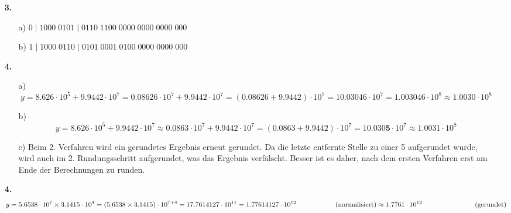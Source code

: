 \documentclass[a4paper,10pt]{scrartcl}
\begin{document}
\begin{enumerate}
\begin{enumerate}
        \end{enumerate}

    \item[\textbf{3.}]
        \begin{enumerate}
            \item[a)]
                $0 \mid 1000\;0101 \mid 0110\;1100\;0000\;0000\;0000\;000$
            
            \item[b)]
                $1 \mid 1000\;0110 \mid 0101\;0001\;0100\;0000\;0000\;000$
    
        \end{enumerate}
        
    \item[\textbf{4.}]
        \begin{enumerate}
            \item[a)]
                \begin{dmath*}
                    y 
                    = 8.626 \cdot 10^5 + 9.9442 \cdot 10^7
                    = 0.08626 \cdot 10^7 + 9.9442 \cdot 10^7
                    = (0.08626 + 9.9442) \cdot 10^7
                    = 10.03046 \cdot 10^7
                    = 1.003046 \cdot 10^8
                    \approx 1.0030 \cdot 10^8
                \end{dmath*}
            
            \item[b)]
                \begin{dmath*}
                    y 
                    = 8.626 \cdot 10^5 + 9.9442 \cdot 10^7
                    \approx 0.0863 \cdot 10^7 + 9.9442 \cdot 10^7
                    = (0.0863 + 9.9442) \cdot 10^7
                    = 10.030\textbf{5} \cdot 10^7
                    \approx  1.0031 \cdot 10^8
                \end{dmath*}

            \item[c)]
                Beim 2. Verfahren wird ein gerundetes Ergebnis erneut gerundet. Da die letzte entfernte Stelle zu
                einer 5 aufgerundet wurde, wird auch im 2. Rundungsschritt aufgerundet, was das Ergebnis verfälscht.
                Besser ist es daher, nach dem ersten Verfahren erst am Ende der Berechnungen zu runden.
            
        \end{enumerate}

    \item[\textbf{4.}]
        \begin{dmath*}
            y 
            = 5.6538 \cdot 10^7 \times 3.1415 \cdot 10^4
            = (5.6538 \times 3.1415) \cdot 10^{7 + 4}
            = 17.7614127 \cdot 10^{11}
            = 1.77614127 \cdot 10^{12}  \text{\hspace{2cm}(normalisiert)}
            \approx 1.7761 \cdot 10^{12}  \text{\hspace{2.7cm}(gerundet)}
        \end{dmath*}
    
    
\end{enumerate}
\end{document}
